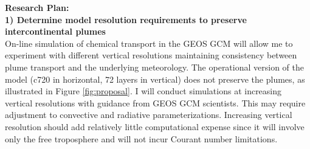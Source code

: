 \documentclass[fleqn, 11pt]{wlscirep}
\begin{document}
\textbf{Research Plan:}\\ 
\textbf{1) Determine model resolution requirements to preserve intercontinental plumes}\\
On-line simulation of chemical transport in the GEOS GCM will allow me to experiment with different vertical resolutions maintaining consistency between plume transport and the underlying meteorology. The operational version of the model (c720 in horizontal, 72 layers in vertical) does not preserve the plumes, as illustrated in Figure \ref{fig:proposal}. I will conduct simulations at increasing vertical resolutions with guidance from GEOS GCM scientists. This may require adjustment to convective and radiative parameterizations. \cite{delane} Increasing vertical resolution should add relatively little computational expense since it will involve only the free troposphere and will not incur Courant number limitations.\cite{zhuang} 
\end{document}
